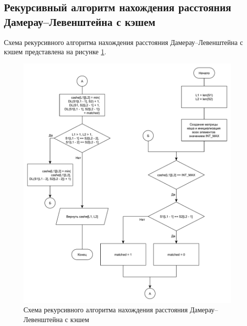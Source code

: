 \subsection{Рекурсивный алгоритм нахождения расстояния Дамерау--Левенштейна с кэшем}

Схема рекурсивного алгоритма нахождения расстояния Дамерау--Левенштейна с кэшем представлена на рисунке \ref{img:dlev_req_cache}.

\begin{figure}[h]
	\centering
	\includegraphics[scale=0.6]{images/dlev_req_cache.pdf}
	\caption{Схема рекурсивного алгоритма нахождения расстояния Дамерау--Левенштейна с кэшем}
	\label{img:dlev_req_cache}
\end{figure}

